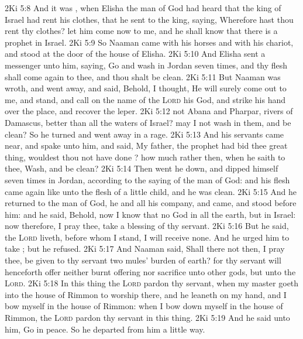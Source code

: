 \vs 2Ki 5:8 And it was , when Elisha the man of God had heard that the king of Israel had rent his clothes, that he sent to the king, saying, Wherefore hast thou rent thy clothes? let him come now to me, and he shall know that there is a prophet in Israel.
\vs 2Ki 5:9 So Naaman came with his horses and with his chariot, and stood at the door of the house of Elisha.
\vs 2Ki 5:10 And Elisha sent a messenger unto him, saying, Go and wash in Jordan seven times, and thy flesh shall come again to thee, and thou shalt be clean.
\vs 2Ki 5:11 But Naaman was wroth, and went away, and said, Behold, I thought, He will surely come out to me, and stand, and call on the name of the \textsc{Lord} his God, and strike his hand over the place, and recover the leper.
\vs 2Ki 5:12  not Abana and Pharpar, rivers of Damascus, better than all the waters of Israel? may I not wash in them, and be clean? So he turned and went away in a rage.
\vs 2Ki 5:13 And his servants came near, and spake unto him, and said, My father,  the prophet had bid thee  great thing, wouldest thou not have done ? how much rather then, when he saith to thee, Wash, and be clean?
\vs 2Ki 5:14 Then went he down, and dipped himself seven times in Jordan, according to the saying of the man of God: and his flesh came again like unto the flesh of a little child, and he was clean.
\vs 2Ki 5:15 And he returned to the man of God, he and all his company, and came, and stood before him: and he said, Behold, now I know that  no God in all the earth, but in Israel: now therefore, I pray thee, take a blessing of thy servant.
\vs 2Ki 5:16 But he said,  the \textsc{Lord} liveth, before whom I stand, I will receive none. And he urged him to take ; but he refused.
\vs 2Ki 5:17 And Naaman said, Shall there not then, I pray thee, be given to thy servant two mules' burden of earth? for thy servant will henceforth offer neither burnt offering nor sacrifice unto other gods, but unto the \textsc{Lord}.
\vs 2Ki 5:18 In this thing the \textsc{Lord} pardon thy servant,  when my master goeth into the house of Rimmon to worship there, and he leaneth on my hand, and I bow myself in the house of Rimmon: when I bow down myself in the house of Rimmon, the \textsc{Lord} pardon thy servant in this thing.
\vs 2Ki 5:19 And he said unto him, Go in peace. So he departed from him a little way.
